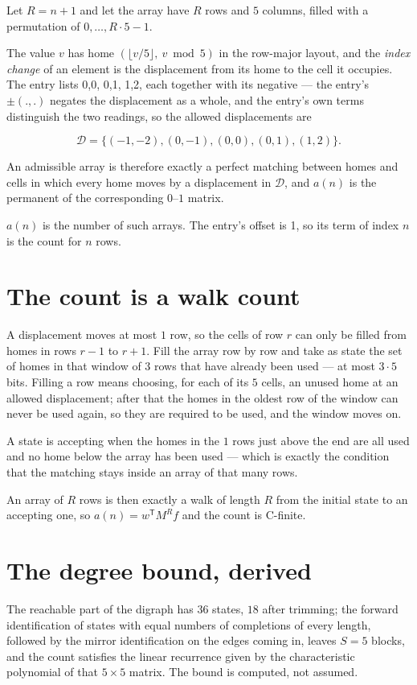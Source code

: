\documentclass[11pt]{article}
\theoremstyle{definition}
\begin{document}
Let $R = n + 1$ and let the array have $R$ rows and $5$ columns, filled with a permutation of $0,\dots,R\cdot5-1$.

The value $v$ has home $(\lfloor v/5\rfloor,\ v \bmod 5)$ in the row-major layout, and the {\itshape index change} of an element is the displacement from its home to the cell it occupies. The entry lists 0,0, 0,1, 1,2, each together with its negative --- the entry's $\pm(.,.)$ negates the displacement as a whole, and the entry's own terms distinguish the two readings, so the allowed displacements are

\[\mathcal{D} = \{(-1,-2), (0,-1), (0,0), (0,1), (1,2)\}.\]

An admissible array is therefore exactly a perfect matching between homes and cells in which every home moves by a displacement in $\mathcal{D}$, and $a(n)$ is the permanent of the corresponding $0$--$1$ matrix.

$a(n)$ is the number of such arrays. The entry's offset is 1, so its term of index $n$ is the count for $n$ rows.

\section{The count is a walk count}

A displacement moves at most $1$ row, so the cells of row $r$ can only be filled from homes in rows $r-1$ to $r+1$. Fill the array row by row and take as state the set of homes in that window of $3$ rows that have already been used --- at most $3\cdot5$ bits. Filling a row means choosing, for each of its $5$ cells, an unused home at an allowed displacement; after that the homes in the oldest row of the window can never be used again, so they are required to be used, and the window moves on.

A state is accepting when the homes in the $1$ rows just above the end are all used and no home below the array has been used --- which is exactly the condition that the matching stays inside an array of that many rows.

An array of $R$ rows is then exactly a walk of length $R$ from the initial state to an accepting one, so $a(n) = w^{\mathsf T}M^{R}f$ and the count is C-finite.

\section{The degree bound, derived}

The reachable part of the digraph has $36$ states, $18$ after trimming; the forward identification of states with equal numbers of completions of every length, followed by the mirror identification on the edges coming in, leaves $S = 5$ blocks, and the count satisfies the linear recurrence given by the characteristic polynomial of that $5\times5$ matrix. The bound is computed, not assumed.
\end{document}
